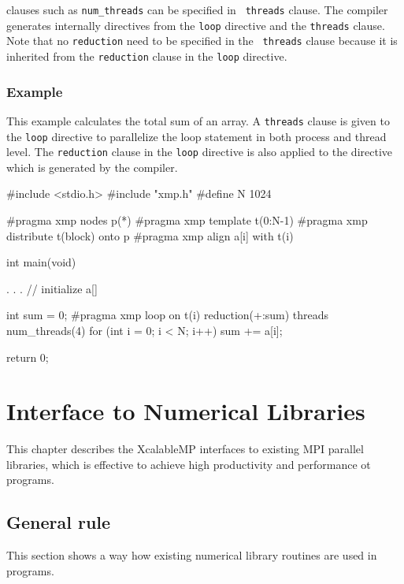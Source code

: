    {\OMP} clauses such as {\tt num\_threads} can be specified in {\tt
   threads} clause.
   The {\XMP} compiler generates internally {\OMP} directives from the
   {\tt loop} directive and the {\tt threads} clause.
   Note that no {\tt reduction} need to be specified in the {\tt
   threads} clause because it is inherited from the {\tt reduction}
   clause in the {\tt loop} directive.

\subsection*{Example}

   This example calculates the total sum of an array.
   A {\tt threads} clause is given to the {\tt loop} directive to
   parallelize the loop statement in both process and
   thread level. 
   The {\tt reduction} clause in the {\tt loop} directive is also
   applied to the {\OMP} directive which is generated by the {\XMP}
   compiler.

\begin{XCexample}
#include <stdio.h>
#include "xmp.h"
#define N 1024

#pragma xmp nodes p(*)
#pragma xmp template t(0:N-1)
#pragma xmp distribute t(block) onto p
#pragma xmp align a[i] with t(i)

int main(void) {
  . . . // initialize a[]

  int sum = 0;
#pragma xmp loop on t(i) reduction(+:sum) threads num_threads(4)
  for (int i = 0; i < N; i++) {
    sum += a[i];
  }

  return 0;
}
\end{XCexample}


\chapter{Interface to Numerical Libraries}
\label{chap:Interface to Numerical Libraries}

   This chapter describes the XcalableMP interfaces to existing MPI
   parallel libraries, which is effective to achieve high productivity
   and performance ot {\XMP} programs.
   
\section{General rule}

   This section shows a way how existing numerical library routines are used in
   {\XMP} programs.


